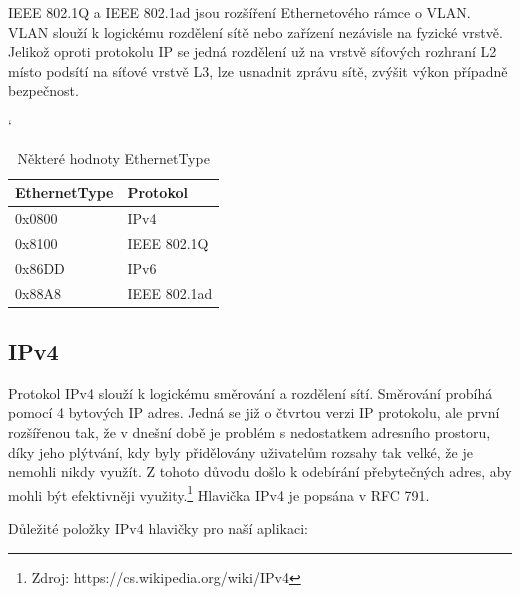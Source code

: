 \documentclass[11pt, a4paper]{article}
\begin{document}
IEEE 802.1Q a IEEE 802.1ad jsou rozšíření Ethernetového rámce o VLAN. 
VLAN slouží k logickému rozdělení sítě nebo zařízení nezávisle na fyzické vrstvě. 
Jelikož oproti protokolu IP se jedná rozdělení už na vrstvě síťových rozhraní L2 místo podsítí na síťové vrstvě L3, lze usnadnit zprávu sítě, zvýšit výkon případně bezpečnost.

\begin{table}[h] \catcode`
	\centering
	\begin{tabular}{| l | l |}
		\hline
		EthernetType & Protokol\\ \hline
		0x0800 & IPv4 \\ \hline
		0x8100 & IEEE 802.1Q \\ \hline
		0x86DD & IPv6 \\ \hline
		0x88A8 & IEEE 802.1ad \\ \hline
	\end{tabular}
	\caption{Některé hodnoty EthernetType}
\end{table}

\subsection{IPv4}

Protokol IPv4 slouží k logickému směrování a rozdělení sítí. 
Směrování probíhá pomocí 4 bytových IP adres. 
Jedná se již o čtvrtou verzi IP protokolu, ale první rozšířenou tak, že v dnešní době je problém s nedostatkem adresního prostoru, díky jeho plýtvání, kdy byly přidělovány uživatelům rozsahy tak velké, že je nemohli nikdy využít. 
Z tohoto důvodu došlo k odebírání přebytečných adres, aby mohli být efektivněji využity.\footnote{Zdroj: https://cs.wikipedia.org/wiki/IPv4} 
Hlavička IPv4 je popsána v RFC 791. \cite{rfc:791}

\newpage
Důležité položky IPv4 hlavičky pro naší aplikaci:
\end{document}
